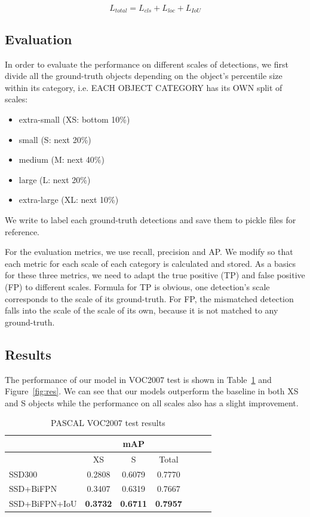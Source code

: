 \documentclass[journal,conference]{IEEEtran}
\begin{document}
\begin{equation}
  L_{total}=L_{cls}+L_{loc}+L_{IoU}\label{eq4}
\end{equation}

\subsection{Evaluation}
In order to evaluate the performance on different scales of detections, we first divide all the ground-truth objects depending on the object’s percentile size within its category, i.e. EACH OBJECT CATEGORY has its OWN split of scales:
\begin{itemize}
  \item extra-small (XS: bottom 10\%)
  \item small (S: next 20\%)
  \item medium (M: next 40\%)
  \item large (L: next 20\%)
  \item extra-large (XL: next 10\%)
\end{itemize}

We write  to label each ground-truth detections and save them to pickle files for reference.

For the evaluation metrics, we use recall, precision and AP. We modify  so that each metric for each scale of each category is calculated and stored. As a basics for these three metrics, we need to adapt the true positive (TP) and false positive (FP) to different scales. Formula for TP is obvious, one detection's scale corresponds to the scale of its ground-truth. For FP, the mismatched detection falls into the scale of the scale of its own, because it is not matched to any ground-truth.

\subsection{Results}
The performance of our model in VOC2007 test is shown in Table~\ref{tab:res} and Figure~\ref{fig:res}. We can see that our models outperform the baseline in both XS and S objects while the performance on all scales also has a slight improvement.

\begin{table}[htbp]
  \centering
  \caption{PASCAL VOC2007 test results}\label{tab:res}
  \begin{tabular}{|l|c|c|c|c|c|c|}
    \hline
     & \multicolumn{3}{|c|}{mAP}    \\
    \hline
                  & XS     & S      & Total \\
    \hline
    SSD300        & 0.2808 & 0.6079 & 0.7770 \\
    SSD+BiFPN     & 0.3407 & 0.6319 & 0.7667  \\
    SSD+BiFPN+IoU & \textbf{0.3732} & \textbf{0.6711} & \textbf{0.7957}\\
    \hline
  \end{tabular}
\end{table}
\end{document}
